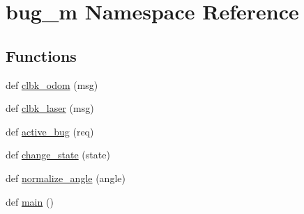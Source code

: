 \hypertarget{namespacebug__m}{}\section{bug\+\_\+m Namespace Reference}
\label{namespacebug__m}
\subsection*{Functions}
\begin{DoxyCompactItemize}
\item 
def \hyperlink{namespacebug__m_a27cfd2a326148157d3e5e0affbe763f3}{clbk\+\_\+odom} (msg)
\item 
def \hyperlink{namespacebug__m_a6ab3d92b5b6ea12eaa52bf21cfa111f1}{clbk\+\_\+laser} (msg)
\item 
def \hyperlink{namespacebug__m_a8da54e1a34cc6f4da728288cf8bd4e5f}{active\+\_\+bug} (req)
\item 
def \hyperlink{namespacebug__m_aca19305feae5c5489e7452e921fcbd9c}{change\+\_\+state} (state)
\item 
def \hyperlink{namespacebug__m_a6547c5ebcd1d3aa3e104a5b573e47862}{normalize\+\_\+angle} (angle)
\item 
def \hyperlink{namespacebug__m_a357589ad533151302b9fa9a893833382}{main} ()
\end{DoxyCompactItemize}
